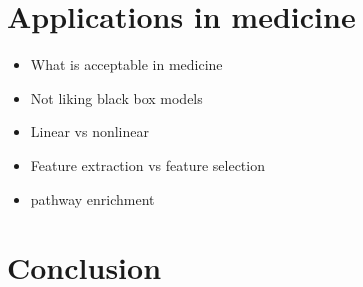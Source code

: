 \documentclass[12pt, wide]{mwart}
\begin{document}
\section{Applications in medicine}

\begin{itemize}
    \item What is acceptable in medicine
    \item Not liking black box models
    \item Linear vs nonlinear
    \item Feature extraction vs feature selection
    \item pathway enrichment
\end{itemize}

\section{Conclusion}



%
\end{document}
